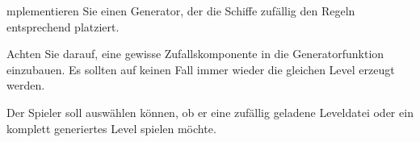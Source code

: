 mplementieren Sie einen Generator, der die Schiffe zuf\"allig den Regeln entsprechend platziert.

Achten Sie darauf, eine gewisse Zufallskomponente in die Generatorfunktion einzubauen.
Es sollten auf keinen Fall immer wieder die gleichen Level erzeugt werden.

Der Spieler soll auswählen können, ob er eine zufällig geladene Leveldatei oder ein komplett generiertes Level spielen möchte.